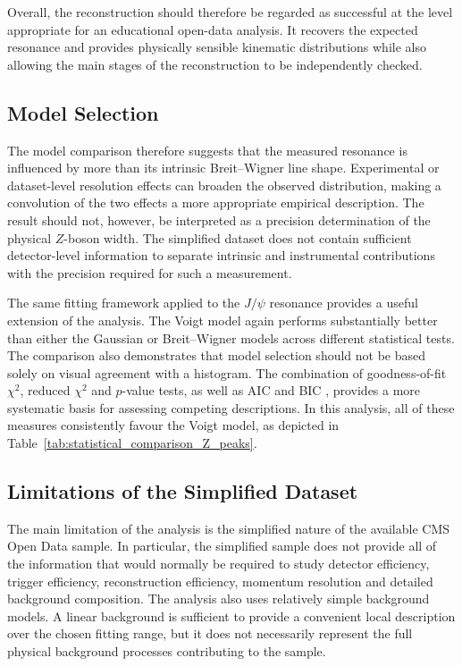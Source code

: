 \documentclass[11pt, a4paper]{article}
\numberwithin{equation}{section}
\begin{document}
Overall, the reconstruction should therefore be regarded as successful at the level appropriate for an educational open-data analysis. It recovers the expected resonance and provides physically sensible kinematic distributions while also allowing the main stages of the reconstruction to be independently checked.

\subsection{Model Selection}

The model comparison therefore suggests that the measured resonance is influenced by more than its intrinsic Breit--Wigner line shape. Experimental or dataset-level resolution effects can broaden the observed distribution, making a convolution of the two effects a more appropriate empirical description. The result should not, however, be interpreted as a precision determination of the physical $Z$-boson width. The simplified dataset does not contain sufficient detector-level information to separate intrinsic and instrumental contributions with the precision required for such a measurement. 

The same fitting framework applied to the $J/\psi$ resonance provides a useful extension of the analysis. The Voigt model again performs substantially better than either the Gaussian or Breit--Wigner models across different statistical tests. The comparison also demonstrates that model selection should not be based solely on visual agreement with a histogram. The combination of goodness-of-fit $\chi^2$, reduced $\chi^2$ and $p$-value tests, as well as AIC \cite{akaike1974aic} and BIC \cite{schwarz1978bic}, provides a more systematic basis for assessing competing descriptions. In this analysis, all of these measures consistently favour the Voigt model, as depicted in Table~\ref{tab:statistical_comparison_Z_peaks}.

\subsection{Limitations of the Simplified Dataset}

The main limitation of the analysis is the simplified nature of the available CMS Open Data sample. In particular, the simplified sample does not provide all of the information that would normally be required to study detector efficiency, trigger efficiency, reconstruction efficiency, momentum resolution and detailed background composition. The analysis also uses relatively simple background models. A linear background is sufficient to provide a convenient local description over the chosen fitting range, but it does not necessarily represent the full physical background processes contributing to the sample.
\end{document}
